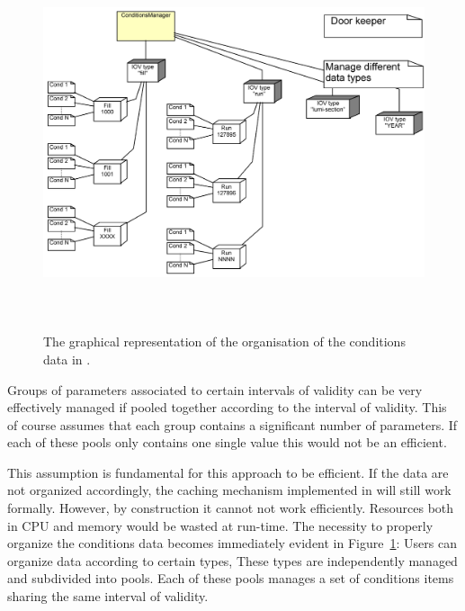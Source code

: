 \documentclass[10pt,a4paper]{article}
\begin{document}
\begin{figure}[t]
  \begin{center}\includegraphics[height=11cm] {DDCond-ConditionsStore}
    \caption{The graphical representation of the organisation of the
             conditions data in \DDH. }
    \label{fig:ddcond-data-organization}
  \end{center}
\end{figure}

\noindent
Groups of parameters associated to certain intervals of validity can
be very effectively managed if pooled together according to the 
interval of validity. This of course assumes that each group contains
a significant number of parameters. If each of these pools only contains
one single value this would not be an efficient.

\noindent
This assumption is fundamental for this approach to be efficient. 
If the data are not
organized accordingly, the caching mechanism implemented in \DDC will 
still work formally. However, by construction it cannot not work efficiently. 
Resources both in CPU and memory would be wasted at run-time.
The necessity to properly organize the conditions data becomes
immediately evident in Figure~\ref{fig:ddcond-data-organization}:
Users can organize data according to certain types, These types are
independently managed and subdivided into pools. Each of these pools
manages a set of conditions items sharing the same interval of validity.
\end{document}
